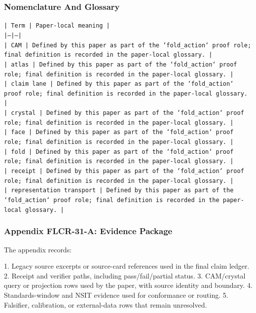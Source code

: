 \documentclass[11pt]{article}
\begin{document}
\subsubsection*{Nomenclature And Glossary}

\noindent\texttt{| Term | Paper-local meaning |}\\
\noindent\texttt{|---|---|}\\
\noindent\texttt{| CAM | Defined by this paper as part of the `fold\_action` proof role; final definition is recorded in the paper-local glossary. |}\\
\noindent\texttt{| atlas | Defined by this paper as part of the `fold\_action` proof role; final definition is recorded in the paper-local glossary. |}\\
\noindent\texttt{| claim lane | Defined by this paper as part of the `fold\_action` proof role; final definition is recorded in the paper-local glossary. |}\\
\noindent\texttt{| crystal | Defined by this paper as part of the `fold\_action` proof role; final definition is recorded in the paper-local glossary. |}\\
\noindent\texttt{| face | Defined by this paper as part of the `fold\_action` proof role; final definition is recorded in the paper-local glossary. |}\\
\noindent\texttt{| fold | Defined by this paper as part of the `fold\_action` proof role; final definition is recorded in the paper-local glossary. |}\\
\noindent\texttt{| receipt | Defined by this paper as part of the `fold\_action` proof role; final definition is recorded in the paper-local glossary. |}\\
\noindent\texttt{| representation transport | Defined by this paper as part of the `fold\_action` proof role; final definition is recorded in the paper-local glossary. |}\\

\subsubsection*{Appendix FLCR-31-A: Evidence Package}

The appendix records:

1. Legacy source excerpts or source-card references used in the final claim ledger.
2. Receipt and verifier paths, including pass/fail/partial status.
3. CAM/crystal query or projection rows used by the paper, with source identity and boundary.
4. Standards-window and NSIT evidence used for conformance or routing.
5. Falsifier, calibration, or external-data rows that remain unresolved.
\end{document}
